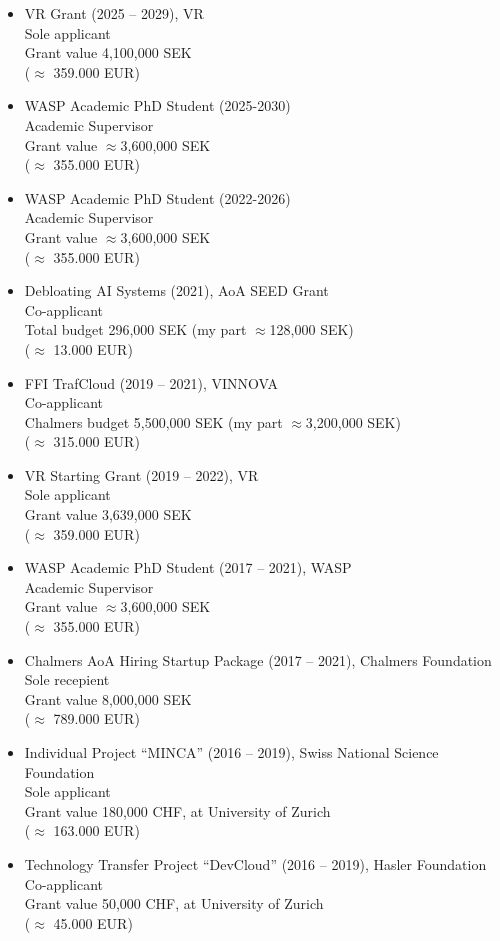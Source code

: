 \documentclass[paper=letter,fontsize=11pt]{scrartcl} %
\begin{document}
\begin{itemize}
  \item VR Grant (2025 -- 2029), VR\\
  Sole applicant\\
	Grant value 4,100,000 SEK\\
  ($\approx$ 359.000 EUR)  
  \item WASP Academic PhD Student (2025-2030)\\
  Academic Supervisor\\
  Grant value $\approx$3,600,000 SEK\\
  ($\approx$ 355.000 EUR)  
  \item WASP Academic PhD Student (2022-2026)\\
  Academic Supervisor\\
  Grant value $\approx$3,600,000 SEK\\
  ($\approx$ 355.000 EUR)
  \item Debloating AI Systems (2021), AoA SEED Grant\\
  Co-applicant\\
  Total budget 296,000 SEK (my part $\approx$128,000 SEK)\\
  ($\approx$ 13.000 EUR)
	\item FFI TrafCloud (2019 -- 2021), VINNOVA\\
	Co-applicant\\
	Chalmers budget 5,500,000 SEK (my part $\approx$3,200,000 SEK)\\
  ($\approx$ 315.000 EUR)
  \item VR Starting Grant (2019 -- 2022), VR\\
  Sole applicant\\
	Grant value 3,639,000 SEK\\
  ($\approx$ 359.000 EUR)
  \item WASP Academic PhD Student (2017 -- 2021), WASP\\
  Academic Supervisor\\
	Grant value $\approx$3,600,000 SEK\\
  ($\approx$ 355.000 EUR)
  \item Chalmers AoA Hiring Startup Package (2017 -- 2021), Chalmers Foundation\\
	Sole recepient\\
  Grant value 8,000,000 SEK\\
  ($\approx$ 789.000 EUR)
  \item Individual Project ``MINCA'' (2016 -- 2019), Swiss National Science Foundation\\
  Sole applicant \\
  Grant value 180,000 CHF, at University of Zurich\\
  ($\approx$ 163.000 EUR)
  \item Technology Transfer Project ``DevCloud'' (2016 -- 2019), Hasler Foundation\\
  Co-applicant \\
  Grant value 50,000 CHF, at University of Zurich\\
  ($\approx$ 45.000 EUR)
\end{itemize}
\end{document}
